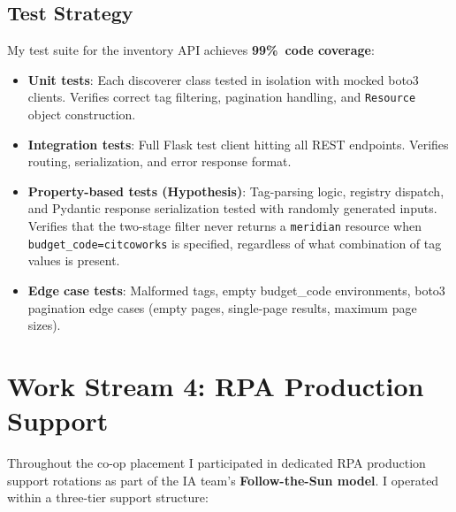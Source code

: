 \subsection{Test Strategy}

My test suite for the inventory API achieves \textbf{99\%~code coverage}:

\begin{itemize}
    \item \textbf{Unit tests}: Each discoverer class tested in isolation
          with mocked boto3 clients. Verifies correct tag filtering,
          pagination handling, and \texttt{Resource} object construction.

    \item \textbf{Integration tests}: Full Flask test client hitting
          all REST endpoints. Verifies routing, serialization, and
          error response format.

    \item \textbf{Property-based tests (Hypothesis)}: Tag-parsing logic,
          registry dispatch, and Pydantic response serialization tested
          with randomly generated inputs. Verifies that the two-stage
          filter never returns a \texttt{meridian} resource when
          \texttt{budget\_code=citcoworks} is specified, regardless of
          what combination of tag values is present.

    \item \textbf{Edge case tests}: Malformed tags, empty budget\_code
          environments, boto3 pagination edge cases (empty pages,
          single-page results, maximum page sizes).
\end{itemize}

\FloatBarrier

\section{Work Stream 4: RPA Production Support}
\label{sec:rpa_production_support}


Throughout the co-op placement I participated in dedicated RPA production support
rotations as part of the IA team's \textbf{Follow-the-Sun model}. I operated within a three-tier support structure:

